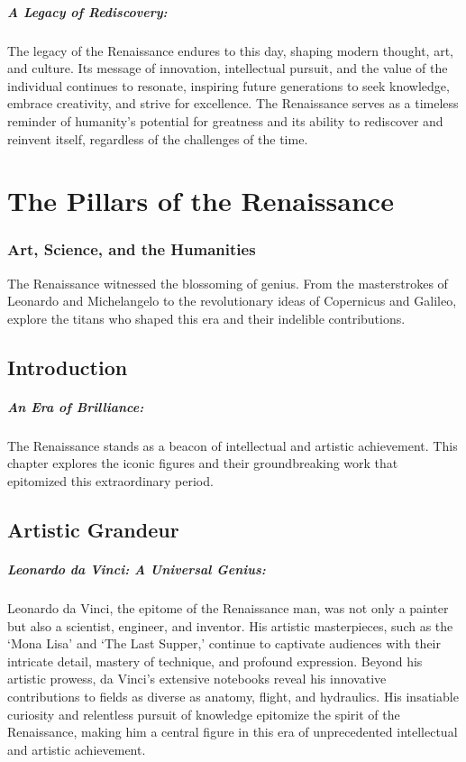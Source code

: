 \documentclass{book}
\begin{document}
\paragraph{A Legacy of Rediscovery:}
The legacy of the Renaissance endures to this day, shaping modern thought, art, and culture. Its message of innovation, intellectual pursuit, and the value of the individual continues to resonate, inspiring future generations to seek knowledge, embrace creativity, and strive for excellence. The Renaissance serves as a timeless reminder of humanity’s potential for greatness and its ability to rediscover and reinvent itself, regardless of the challenges of the time.

\chapter{The Pillars of the Renaissance}
\subsection*{Art, Science, and the Humanities}
The Renaissance witnessed the blossoming of genius. From the masterstrokes of Leonardo and Michelangelo to the revolutionary ideas of Copernicus and Galileo, explore the titans who shaped this era and their indelible contributions.

\section*{Introduction}

\paragraph{An Era of Brilliance:}
The Renaissance stands as a beacon of intellectual and artistic achievement. This chapter explores the iconic figures and their groundbreaking work that epitomized this extraordinary period.

\section*{Artistic Grandeur}

\paragraph{Leonardo da Vinci: A Universal Genius:}
Leonardo da Vinci, the epitome of the Renaissance man, was not only a painter but also a scientist, engineer, and inventor. His artistic masterpieces, such as the ‘Mona Lisa’ and ‘The Last Supper,’ continue to captivate audiences with their intricate detail, mastery of technique, and profound expression. Beyond his artistic prowess, da Vinci's extensive notebooks reveal his innovative contributions to fields as diverse as anatomy, flight, and hydraulics. His insatiable curiosity and relentless pursuit of knowledge epitomize the spirit of the Renaissance, making him a central figure in this era of unprecedented intellectual and artistic achievement.
\end{document}
